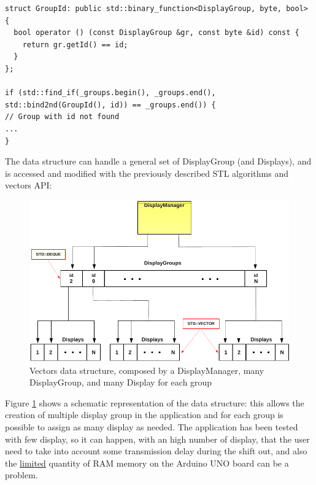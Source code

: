 \documentclass[11pt,english]{article}
\begin{document}
%                                       
\begin{lstlisting}[label=lis:display-manager-predicate, caption=DisplayManager: STL Adaptable Binary Predicate 
for find and replace algorithms]
struct GroupId: public std::binary_function<DisplayGroup, byte, bool> {
  bool operator () (const DisplayGroup &gr, const byte &id) const {
    return gr.getId() == id;
  }
};

if (std::find_if(_groups.begin(), _groups.end(), std::bind2nd(GroupId(), id)) == _groups.end()) {
// Group with id not found
...
}
\end{lstlisting}

The data structure can handle a general set of DisplayGroup (and Displays), and is accessed and 
modified with the previously described STL algorithms and vectors API:

%
\begin{figure}[htb]
\centering\includegraphics[scale=0.85]{img/Vectors}

\caption{Vectors data structure, composed by a DisplayManager, many DisplayGroup, and many Display for each 
group  \label{fig:vectors}}

\end{figure}

Figure \ref{fig:vectors} shows a schematic representation of the data structure: this allows the creation of 
multiple display group in the application and for each group is possible to assign as many display as needed.
The application has been tested with few display, so it can happen, with an high number of display, that the 
user need to take into account some transmission delay during the shift out, and also the \underline{limited} 
quantity of RAM memory on the Arduino UNO board can be a problem.
\end{document}
